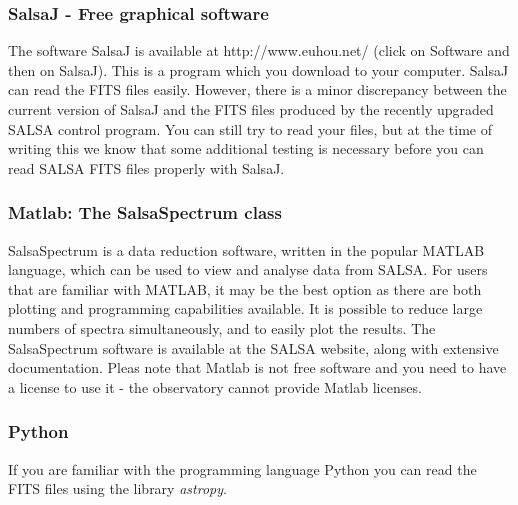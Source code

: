 \subsubsection{SalsaJ - Free graphical software}
The software SalsaJ is available at http://www.euhou.net/ (click on Software
and then on SalsaJ).  This is a program which you download to your computer.
SalsaJ can read the FITS files easily. However, there is a minor discrepancy
between the current version of SalsaJ and the FITS files produced by the
recently upgraded SALSA control program. You can still try to read your files,
but at the time of writing this we know that some additional testing is
necessary before you can read SALSA FITS files properly with SalsaJ.

\subsubsection{Matlab: The SalsaSpectrum class}
SalsaSpectrum is a data reduction software, written in the popular MATLAB
language, which can be used to view and analyse data from SALSA. For users that
are familiar with MATLAB, it may be the best option as there are both plotting
and programming capabilities available. It is possible to reduce large numbers
of spectra simultaneously, and to easily plot the results. The SalsaSpectrum
software is available at the SALSA website, along with extensive documentation.
Pleas note that Matlab is not free software and you need to have a license to
use it - the observatory cannot provide Matlab licenses.  

\subsubsection{Python}
If you are familiar with the programming language Python you can read the FITS files
using the library \emph{astropy}.
